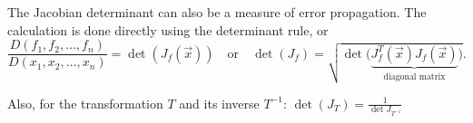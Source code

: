 The Jacobian determinant can also be a measure of error propagation.
The calculation is done directly using the determinant rule, or
$$\frac{D(f_1, f_2, \ldots,f_n)}{D(x_1, x_2, \ldots, x_n)} = \det(J_f(\vec{x})) \quad \text{or} \quad
\det(J_f) = \sqrt{\det \Big( \underbrace{J_f^T(\vec{x}) J_f(\vec{x})}_{\text{diagonal matrix}} \Big)}.$$

Also, for the transformation $T$ and its inverse $T^{-1}$: $\det(J_T) = \frac{1}{\det{J_{T^{-1}}}}$
\hspace{5mm}
